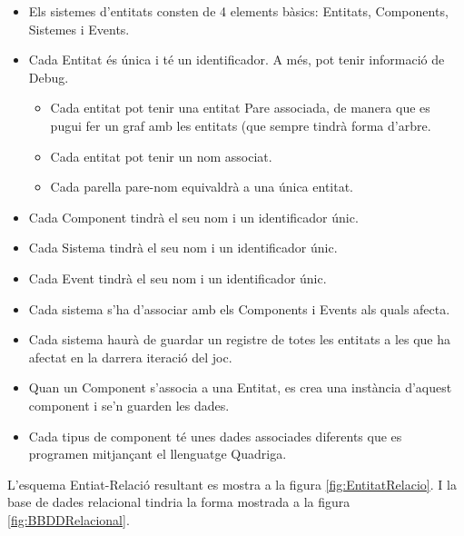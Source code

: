   \begin{itemize}
    \item Els sistemes d'entitats consten de 4 elements bàsics: Entitats, Components, Sistemes i Events.
    
    \item Cada Entitat és única i té un identificador. A més, pot tenir informació de Debug.
      \begin{itemize}
        \item Cada entitat pot tenir una entitat Pare associada, de manera que es pugui fer un graf amb les entitats (que sempre tindrà forma d'arbre.
        \item Cada entitat pot tenir un nom associat.
        \item Cada parella pare-nom equivaldrà a una única entitat.
      \end{itemize}
    \item Cada Component tindrà el seu nom i un identificador únic.
    
    \item Cada Sistema tindrà el seu nom i un identificador únic.
    
    \item Cada Event tindrà el seu nom i un identificador únic.
    
    \item Cada sistema s'ha d'associar amb els Components i Events als quals afecta.
    
    \item Cada sistema haurà de guardar un registre de totes les entitats a les que ha afectat en la darrera iteració del joc.
    
    \item Quan un Component s'associa a una Entitat, es crea una instància d'aquest component i se'n guarden les dades.
    
    \item Cada tipus de component té unes dades associades diferents que es programen mitjançant el llenguatge Quadriga.
  \end{itemize}

  L'esquema Entiat-Relació resultant es mostra a la figura \ref{fig:EntitatRelacio}. I la base de dades relacional tindria la forma mostrada a la figura \ref{fig:BBDDRelacional}.

